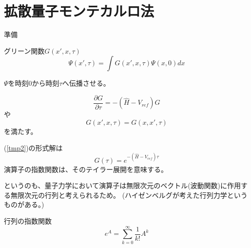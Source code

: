 \documentclass[dvipdfmx]{beamer}
\begin{document}
    \section{拡散量子モンテカルロ法}
    \begin{frame}{準備}
        \begin{block}{グリーン関数$G(x',x,\tau)$}
            \begin{equation}
                \Psi(x',\tau) = \int G(x',x,\tau)\Psi(x,0)dx
            \end{equation}
        \end{block}

        $\Psi$を時刻$0$から時刻$\tau$へ伝播させる。

        \begin{equation}
            \label{tmp2}
            \dfrac{\partial G}{\partial \tau} = -(\hat{H} - V_{ref})G
        \end{equation}
        や
        \begin{equation}
            G(x',x,\tau) = G(x,x',\tau)
        \end{equation}
        を満たす。
    \end{frame}

    \begin{frame}
        (\ref{tmp2})の形式解は
        \begin{equation}
            G(\tau) = e^{-(\hat{H} - V_{ref})\tau}
        \end{equation}
        演算子の指数関数は、そのテイラー展開を意味する。

        というのも、量子力学において演算子は無限次元のベクトル(波動関数)に作用する無限次元の行列と考えられるため。
        (ハイゼンベルグが考えた行列力学というものがある。)

        \begin{block}{行列の指数関数}
            \begin{equation}
                e^A = \sum_{k=0}^\infty \dfrac{1}{k!}A^k
            \end{equation}
        \end{block}
    \end{frame}
\end{document}
